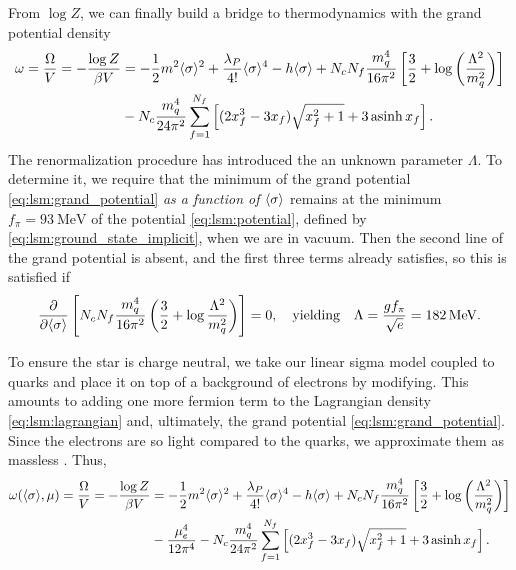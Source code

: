 From $\log Z$, we can finally build a bridge to thermodynamics with the grand potential density
\begin{equation}
\begin{split}
	\omega = \frac{\Omega}{V} = -\frac{\log Z}{\beta V} &= -\frac12 m^2 \langle \sigma \rangle^2 + \frac{\lambda_P}{4!} \langle \sigma \rangle^4 - h \langle \sigma \rangle + N_c N_f \frac{m_q^4}{16 \pi^2} \left[ \frac{3}{2} + \log\left(\frac{{\Lambda}^2}{m_q^2}\right) \right] \\
	                                                    &- N_c \frac{m_q^4}{24 \pi^2} \sum_{f=1}^{N_f} \left[ (2 x_f^3 - 3x_f) \sqrt{x_f^2 + 1} + 3 \operatorname{asinh} x_f \right] .
\end{split}
\label{eq:lsm:grand_potential}
\end{equation}
The renormalization procedure has introduced the an unknown parameter $\Lambda$.
To determine it, we require that the minimum of the grand potential \eqref{eq:lsm:grand_potential} \emph{as a function of $\langle \sigma \rangle$} remains at the minimum $f_\pi = \SI{93}{\mega\electronvolt}$ of the potential \eqref{eq:lsm:potential}, defined by \eqref{eq:lsm:ground_state_implicit}, when we are in vacuum.
Then the second line of the grand potential is absent, and the first three terms already satisfies, so this is satisfied if
\begin{equation}
	\pdv*{\left[ N_c N_f \frac{m_q^4}{16 \pi^2} \left( \frac32 + \log \frac{\Lambda^2}{m_q^2} \right) \right] }{\langle \sigma \rangle} = 0,
	\quad \text{yielding} \quad
	\Lambda = \frac{g f_\pi}{\sqrt{e}} = \SI{182}{\mega\electronvolt}.
\end{equation}

To ensure the star is charge neutral, we take our linear sigma model coupled to quarks and place it on top of a background of electrons by modifying.
This amounts to adding one more fermion term to the Lagrangian density \eqref{eq:lsm:lagrangian} and, ultimately, the grand potential \eqref{eq:lsm:grand_potential}.
Since the electrons are so light compared to the quarks, we approximate them as massless .
Thus,
\begin{equation}
\begin{split}
	\omega(\langle \sigma \rangle,\mu) = \frac{\Omega}{V} = -\frac{\log Z}{\beta V} &= -\frac12 m^2 \langle \sigma \rangle^2 + \frac{\lambda_P}{4!} \langle \sigma \rangle^4 - h \langle \sigma \rangle + N_c N_f \frac{m_q^4}{16 \pi^2} \left[ \frac{3}{2} + \log\left(\frac{{\Lambda}^2}{m_q^2}\right) \right] \\
	                                            &- \frac{\mu_e^4}{12 \pi^4} - N_c \frac{m_q^4}{24 \pi^2} \sum_{f=1}^{N_f} \left[ (2 x_f^3 - 3x_f) \sqrt{x_f^2 + 1} + 3 \operatorname{asinh} x_f \right] .
\end{split}
\label{eq:lsm:grand_potential}
\end{equation}

